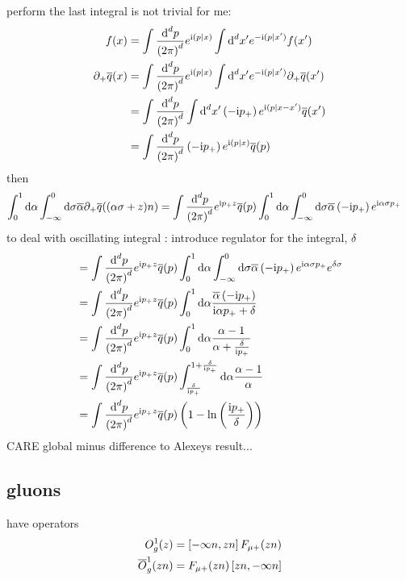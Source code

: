 perform the last integral is not trivial for me:
\begin{align}
	f(x) 
	&=
	\int \dxfm{p}{d} \expo^{\imag \skp{p}{x}} \int \dxfs{x'}{d} \expo^{-\imag\skp{p}{x'}} f(x')
	\\
	\partial_+\qbar(x) 
	&=
	\int \dxfm{p}{d} \expo^{\imag \skp{p}{x}} \int \dxfs{x'}{d} \expo^{-\imag\skp{p}{x'}} \partial_+\qbar(x')
	\\
	&=
	\int \dxfm{p}{d} \int \dxfs{x'}{d} \left(-\imag \pp\right)\expo^{\imag\skp{p}{x-x'}}\qbar(x')
	\\
	&=
	\int \dxfm{p}{d} \left(-\imag \pp\right)\expo^{\imag\skp{p}{x}}\qbar(p)
\end{align}
then 
\begin{align}
	\int _0^1\dx \alpha \int _{-\infty}^{0} \dx \sigma \overline \alpha \partial_+ \qbar((\alpha\sigma+z)n)
	&=
	\int \dxfm{p}{d}\expo^{\imag \pp z}\qbar(p)\int _0^1\dx \alpha \int _{-\infty}^{0} \dx \sigma \overline \alpha \left(-\imag \pp\right)\expo^{\imag \alpha \sigma \pp}
\end{align}
to deal with oscillating integral : introduce regulator for the integral, $\delta$
\begin{align}
	&=
	\int \dxfm{p}{d}\expo^{\imag \pp z}\qbar(p)\int _0^1\dx \alpha \int _{-\infty}^{0} \dx \sigma \overline \alpha\left(-\imag \pp\right) \expo^{\imag \alpha \sigma \pp}\expo^{\delta\sigma}
	\\
	&=
	\int \dxfm{p}{d}\expo^{\imag \pp z}\qbar(p)\int _0^1\dx \alpha  \frac{\overline \alpha \left(-\imag \pp\right)}{\imag \alpha \pp + \delta}
	\\
	&=
	\int \dxfm{p}{d}\expo^{\imag \pp z}\qbar(p)\int _0^1\dx \alpha  \frac{\alpha-1 }{\alpha + \frac{\delta}{\imag \pp}}
	\\
		&=
	\int \dxfm{p}{d}\expo^{\imag \pp z}\qbar(p)\int _{\frac{\delta}{\imag \pp}}^{1+\frac{\delta}{\imag \pp}}\dx \alpha  \frac{\alpha-1 }{\alpha}
	\\
	&=
	\int \dxfm{p}{d}\expo^{\imag \pp z}\qbar(p) \left(1-\ln\left(\frac{\imag \pp}{\delta}\right)\right)
\end{align}
CARE global minus difference to Alexeys result...  

\subsection{gluons}
have operators
\begin{align}
	\twog{1}(z) 
	&=
	\wil{-\infty n}{zn} \ft_{\mu +} (zn)
	\\
	\twogbar{1}(zn) 
	&=
	\ft_{\mu +}(zn)\wil{zn}{-\infty n }
\end{align}


